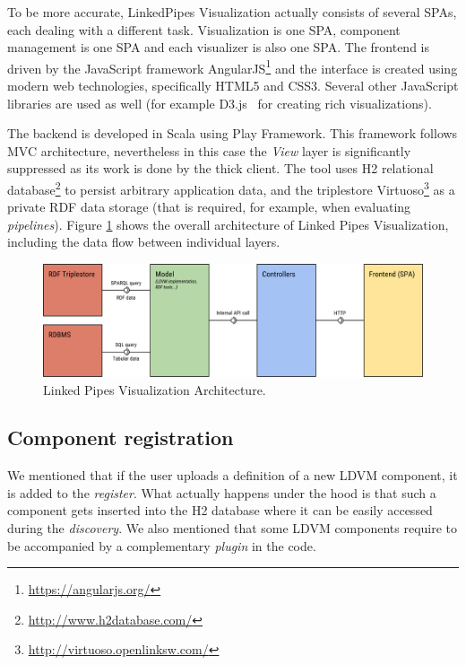 To be more accurate, LinkedPipes Visualization actually consists of several SPAs, each dealing with a different task. Visualization is one SPA, component management is one SPA and each visualizer is also one SPA. The frontend is driven by the JavaScript framework AngularJS\footnote{\url{https://angularjs.org/}} and the interface is created using modern web technologies, specifically HTML5 and CSS3. Several other JavaScript libraries are used as well (for example D3.js~\cite{d3js} for creating rich visualizations).

The backend is developed in Scala using Play Framework. This framework follows MVC architecture, nevertheless in this case the \emph{View} layer is significantly suppressed as its work is done by the thick client. The tool uses H2 relational database\footnote{\url{http://www.h2database.com/}} to persist arbitrary application data, and the triplestore Virtuoso\footnote{\url{http://virtuoso.openlinksw.com/}} as a private RDF data storage (that is required, for example, when evaluating \emph{pipelines}). Figure \ref{fig:linked-pipes-visualization-architecture} shows the overall architecture of Linked Pipes Visualization, including the data flow between individual layers.

\begin{figure}
	\centering
	\includegraphics[width=140mm]{img/03_linked_pipes_visualization_architecture.png}
	\caption{Linked Pipes Visualization Architecture.}
    \label{fig:linked-pipes-visualization-architecture}
\end{figure}

\subsection{Component registration}
\label{sec:linkedpipes:component_registration}

We mentioned that if the user uploads a definition of a new LDVM component, it is added to the \emph{register}. What actually happens under the hood is that such a component gets inserted into the H2 database where it can be easily accessed during the \emph{discovery}. We also mentioned that some LDVM components require to be accompanied by a complementary \emph{plugin} in the code.

